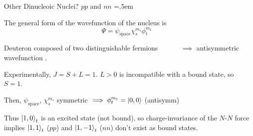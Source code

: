 \documentclass[xcolor={dvipsnames}]{beamer}
\let\olditemize=\itemize
\let\endolditemize=\enditemize
\renewenvironment{itemize}{\olditemize \itemsep=.5em }{\endolditemize}
\begin{document}
\begin{frame}{Other Dinucleoic Nuclei?}
\alert{$pp$ and $nn$}
\begin{itemize}
    \item<2-> The general form of the wavefunction of the nucleus is
    \[ \Psi = \psi_\text{space}\chi_s^{m_s}\phi_t^{m_t} \]
    \item<3-> Deuteron composed of two distinguishable fermions $\qquad\quad\implies$ antisymmetric wavefunction \cite{bertulani2007nuclear}.
    \item<4-> Experimentally, $J = S + L = 1$. $L > 0$ is incompatible with a bound state, so $S = 1$.
    \item<5-> Then, $\psi_\text{space}$, $\chi_s^{m_s}$ symmetric $\implies \phi_t^{m_t} = \ket{0, 0}$ (antisymm) 
    \item<6-> Thus $\ket{1, 0}_t$ is an excited state (not bound), so charge-invariance of the $N$-$N$ force implies $\ket{1, 1}_t$ ($pp$) and $\ket{1, -1}_t$ ($nn$) don't exist as bound states.
\end{itemize}
\end{frame}
\end{document}
